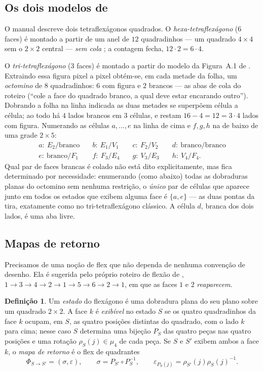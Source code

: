 \documentclass[11pt,a4paper]{article}
\theoremstyle{plain}
\theoremstyle{definition}
\newtheorem{definicao}[teorema]{Definição}
\theoremstyle{remark}
\begin{document}
\subsection{Os dois modelos de \cite{manual}}
O manual descreve dois tetraflexágonos quadrados. O \emph{hexa-tetraflexágono}
($6$ faces) é montado a partir de um anel de $12$ quadradinhos --- um quadrado
$4\times4$ sem o $2\times2$ central --- \emph{sem cola} \cite[\S1.2]{manual};
a contagem fecha, $12\cdot2=6\cdot4$.

O \emph{tri-tetraflexágono} ($3$ faces) é montado a partir do modelo da
Figura~A.1 de \cite{manual}. Extraindo essa figura pixel a pixel obtém-se, em
cada metade da folha, um \emph{octomino} de $8$ quadradinhos: $6$ com figura e
$2$ brancos --- as abas de cola do roteiro (``cole a face do quadrado branco, a
qual deve estar encarando outro''). Dobrando a folha na linha indicada as duas
metades se superpõem célula a célula; ao todo há $4$ lados brancos em $3$
células, e restam $16-4=12=3\cdot4$ lados com figura. Numerando as células
$a,\dots,e$ na linha de cima e $f,g,h$ na de baixo de uma grade $2\times5$:
\[
\begin{array}{llll}
a:\ E_2/\text{branco} &\quad b:\ E_1/V_1 &\quad c:\ F_2/V_2 &\quad d:\ \text{branco}/\text{branco}\\
e:\ \text{branco}/F_1 &\quad f:\ F_3/E_4 &\quad g:\ V_3/E_3 &\quad h:\ V_4/F_4 .
\end{array}
\]
Qual par de faces brancas é colado não está dito explicitamente, mas fica
determinado por necessidade: enumerando (como abaixo) todas as dobraduras
planas do octomino sem nenhuma restrição, o \emph{único} par de células que
aparece junto em todos os estados que exibem alguma face é $\{a,e\}$ --- as
duas pontas da tira, exatamente como no tri-tetraflexágono clássico. A célula
$d$, branca dos dois lados, é uma aba livre.

\subsection{Mapas de retorno}
Precisamos de uma noção de flex que não dependa de nenhuma convenção de
desenho. Ela é sugerida pelo próprio roteiro de flexão de \cite[p.~6]{manual},
$1 \to 3 \to 4 \to 2 \to 1 \to 5 \to 6 \to 2 \to 1$, em que as faces $1$ e $2$
\emph{reaparecem}.

\begin{definicao}\label{def:retorno}
Um \emph{estado} do flexágono é uma dobradura plana do seu plano sobre um
quadrado $2\times2$. A face $k$ é \emph{exibível} no estado $S$ se os quatro
quadradinhos da face $k$ ocupam, em $S$, as quatro posições distintas do
quadrado, com o lado $k$ para cima; nesse caso $S$ determina uma bijeção $P_S$
das quatro peças nas quatro posições e uma rotação $\rho_S(j)\in\mu_4$ de cada
peça. Se $S$ e $S'$ exibem ambos a face $k$, o \emph{mapa de retorno} é o flex
de quadrantes
\[
\Phi_{S\to S'}=(\sigma,\varepsilon),\qquad \sigma=P_{S'}\circ P_S^{-1},\qquad
\varepsilon_{P_S(j)}=\rho_{S'}(j)\rho_S(j)^{-1}.
\]
\end{definicao}
\end{document}
